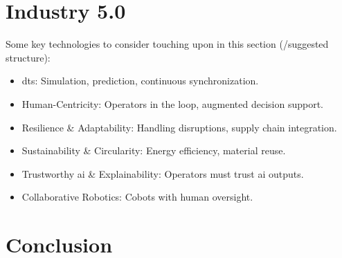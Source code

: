 \documentclass{report}
\begin{document}








\chapter{Industry 5.0}

Some key technologies to consider touching upon in this section (/suggested structure):
\begin{itemize}
    \item \ac{dt}s: Simulation, prediction, continuous synchronization.
    \item Human-Centricity: Operators in the loop, augmented decision support.
    \item Resilience \& Adaptability: Handling disruptions, supply chain integration.
    \item Sustainability \& Circularity: Energy efficiency, material reuse.
    \item Trustworthy \ac{ai} \& Explainability: Operators must trust \ac{ai} outputs.
    \item Collaborative Robotics: Cobots with human oversight.
\end{itemize}









\chapter{Conclusion}


\newpage

 

\end{document}
